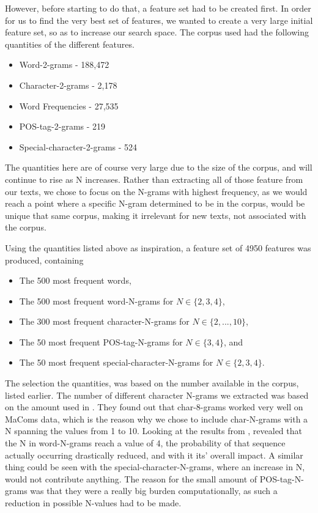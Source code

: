 However, before starting to do that, a feature set had to be created
first. In order for us to find the very best set of features, we wanted
to create a very large initial feature set, so as to increase our search space.
The corpus used had the following quantities of the different features.

\begin{itemize}
    \item Word-2-grams - 188,472
    \item Character-2-grams - 2,178
    \item Word Frequencies - 27,535
    \item \gls{POS}-tag-2-grams - 219
    \item Special-character-2-grams - 524
\end{itemize}

The quantities here are of course very large due to the size of the corpus,
and will continue to rise as N increases. Rather than extracting all
of those feature from our texts, we chose to focus on the N-grams
with highest frequency, as we would reach a point where a specific N-gram
determined to be in the corpus, would be unique that same corpus, making it
irrelevant for new texts, not associated with the corpus.

Using the quantities listed above as inspiration, a feature set of 4950
features was produced, containing

\begin{itemize}
    \item The 500 most frequent words,
    \item The 500 most frequent word-N-grams for $N \in \{2,3,4\}$,
    \item The 300 most frequent character-N-grams for $N \in \{2,...,10\}$,
    \item The 50 most frequent \gls{POS}-tag-N-grams for $N \in \{3,4\}$, and
    \item The 50 most frequent special-character-N-grams for $N \in \{2,3,4\}$.
\end{itemize}

The selection the quantities, was based on the number available in the corpus,
listed earlier. The number of different character N-grams we extracted was based
on the amount used in \citet{aalykke2016}. They found out that char-8-grams
worked very well on MaComs data, which is the reason why we chose to include
char-N-grams with a N spanning the values from 1 to 10. Looking at the results
from \citet{US}, revealed that the N in word-N-grams reach a value of 4,
the probability of that sequence actually occurring drastically reduced,
and with it its' overall impact. A similar thing could be seen with the
special-character-N-grams, where an increase in N, would not contribute
anything. The reason for the small amount of \gls{POS}-tag-N-grams was that
they were a really big burden computationally, as such a reduction in possible
N-values had to be made.

